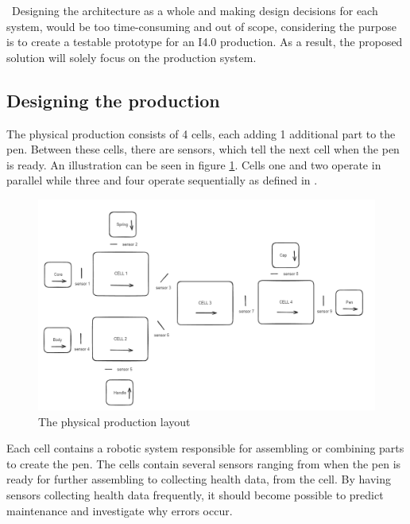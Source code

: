 \
Designing the architecture as a whole and making design decisions for each system, would be too time-consuming and out of scope, considering the purpose is to create a testable prototype for an I4.0 production. 
As a result, the proposed solution will solely focus on the production system.

\subsection{Designing the production}
The physical production consists of 4 cells, each adding 1 additional part to the pen. Between these cells, there are sensors, which tell the next cell when the pen is ready. 
An illustration can be seen in figure \ref{figure:3}. Cells one and two operate in parallel while three and four operate sequentially as defined in \cite{torben21}.

\begin{figure}[ht]
    \centering
    \includegraphics[scale=0.3]{Images/ProductionLayout.png}
    \caption{The physical production layout}
    \label{figure:3}
\end{figure}

Each cell contains a robotic system responsible for assembling or combining parts to create the pen. The cells contain several sensors ranging from when the pen is ready for further assembling to collecting health data, from the cell. By having sensors collecting health data frequently, it should become possible to predict maintenance and investigate why errors occur.
\
